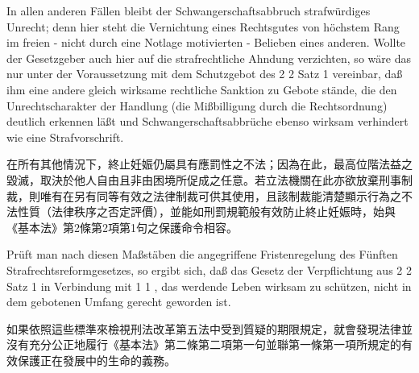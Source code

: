 \documentclass[12pt]{article}
\begin{document}
\syncleft
\begin{sourcepara}
In allen anderen Fällen bleibt der Schwangerschaftsabbruch strafwürdiges Unrecht; denn hier steht die Vernichtung eines Rechtsgutes von höchstem Rang im freien - nicht durch eine Notlage motivierten - Belieben eines anderen. Wollte der Gesetzgeber auch hier auf die strafrechtliche Ahndung verzichten, so wäre das nur unter der Voraussetzung mit dem Schutzgebot des \abbrArt{} 2 \abbrAbs{} 2 Satz 1 \abbrGG{}\ggfnArtTwoTwoOneDE{} vereinbar, daß ihm eine andere gleich wirksame rechtliche Sanktion zu Gebote stände, die den Unrechtscharakter der Handlung (die Mißbilligung durch die Rechtsordnung) deutlich erkennen läßt und Schwangerschaftsabbrüche ebenso wirksam verhindert wie eine Strafvorschrift.
\end{sourcepara}
\begin{transpara}
在所有其他情況下，終止妊娠仍屬具有應罰性之不法；因為在此，最高位階法益之毀滅，取決於他人自由且非由困境所促成之任意。若立法機關在此亦欲放棄刑事制裁，則唯有在另有同等有效之法律制裁可供其使用，且該制裁能清楚顯示行為之不法性質（法律秩序之否定評價），並能如刑罰規範般有效防止終止妊娠時，始與《基本法》第2條第2項第1句\ggfnArtTwoTwoOneZH{}之保護命令相容。
\end{transpara}

\syncleft
\begin{sourcepara}
Prüft man nach diesen Maßstäben die angegriffene Fristenregelung des Fünften Strafrechtsreformgesetzes, so ergibt sich, daß das Gesetz der Verpflichtung aus \abbrArt{} 2 \abbrAbs{} 2 Satz 1 in Verbindung mit \abbrArt{} 1 \abbrAbs{} 1 \abbrGG{}\ggfnLifeDignityDE{}, das werdende Leben wirksam zu schützen, nicht in dem gebotenen Umfang gerecht geworden ist.
\end{sourcepara}
\begin{transpara}
如果依照這些標準來檢視刑法改革第五法中受到質疑的期限規定，就會發現法律並沒有充分公正地履行《基本法》第二條第二項第一句\ggfnArtTwoTwoOneZH{}並聯第一條第一項\ggfnLifeDignityZH{}所規定的有效保護正在發展中的生命的義務。
\end{transpara}
\end{document}
